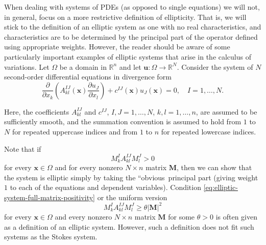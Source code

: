 When dealing with systems of PDEs (as opposed to single equations) we will not, in general, focus on a more restrictive definition of ellipticity. That is, we will stick to the definition of an elliptic system as one with no real characteristics, and characteristics are to be determined by the principal part of the operator defined using appropriate weights. However, the reader should be aware of some particularly important examples of elliptic systems that arise in the calculus of variations. Let $\Omega$ be a domain in $\mathbb{R}^n$ and let $\bm{u}:\Omega\to\mathbb{R}^N$. Consider the system of $N$ second-order differential equations in divergence form
\begin{equation}\label{eq:second-order-divergence-system-definition}
\frac{\partial}{\partial x_k}\left(A_{kl}^{IJ}(\bm{x})\frac{\partial u_J}{\partial x_l}\right)+c^{IJ}(\bm{x})u_J(\bm{x})=0,\quad I=1,\ldots,N.
\end{equation}


Here, the coefficients $A_{kl}^{IJ}$ and $c^{IJ}$, $I,J=1,\ldots,N$, $k,l=1,\ldots,n$, are assumed to be sufficiently smooth, and the summation convention is assumed to hold from $1$ to $N$ for repeated uppercase indices and from $1$ to $n$ for repeated lowercase indices.

Note that if
\begin{equation}\label{eq:elliptic-system-full-matrix-positivity}
M_k^IA_{kl}^{IJ}M_l^J>0
\end{equation}
for every $\bm{x}\in\Omega$ and for every nonzero $N\times n$ matrix $\bm{M}$, then we can show that the system is elliptic simply by taking the ``obvious\textquotesingle\textquotesingle\ principal part (giving weight $1$ to each of the equations and dependent variables). Condition \eqref{eq:elliptic-system-full-matrix-positivity} or the uniform version
\begin{equation}\label{eq:elliptic-system-full-matrix-uniform-bound}
M_k^IA_{kl}^{IJ}M_l^J\geq\theta|\bm{M}|^2
\end{equation}
for every $\bm{x}\in\Omega$ and every nonzero $N\times n$ matrix $\bm{M}$ for some $\theta>0$ is often given as a definition of an elliptic system. However, such a definition does not fit such systems as the Stokes system.

